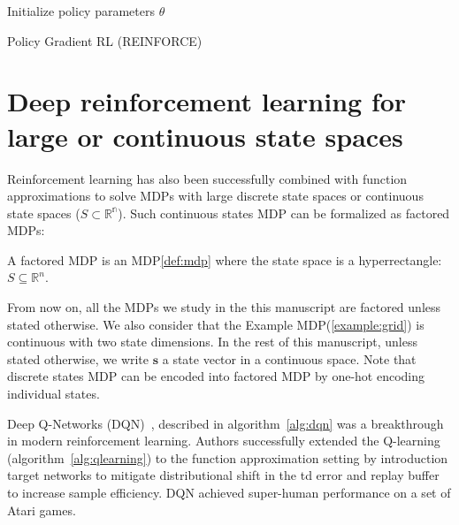 \begin{algorithm}
    Initialize policy parameters $\theta$ \\
    \caption{Policy Gradient RL (REINFORCE)}\label{alg:reinforce}
\end{algorithm}


\section{Deep reinforcement learning for large or continuous state spaces}\label{sec:drl}

Reinforcement learning has also been successfully combined with function approximations \cite{td-gammon} to solve MDPs with large discrete state spaces or continuous state spaces ($S \subset \mathbb{R^n}$).
Such continuous states MDP can be formalized as factored MDPs\cite{fmdp}:

\begin{definition}\label{def:fmdp} A factored MDP is an MDP\ref{def:mdp} where the state space is a hyperrectangle: $S\subseteq \mathbb{R}^n$.
\end{definition}

From now on, all the MDPs we study in the this manuscript are factored unless stated otherwise. 
We also consider that the Example MDP(\ref{example:grid}) is continuous with two state dimensions.
In the rest of this manuscript, unless stated otherwise, we write $\boldsymbol{s}$ a state vector in a continuous space.
Note that discrete states MDP can be encoded into factored MDP by one-hot encoding individual states.

Deep Q-Networks (DQN)~\cite{dqn}, described in algorithm~\ref{alg:dqn} was a breakthrough in modern reinforcement learning.
Authors successfully extended the Q-learning (algorithm~\ref{alg:qlearning}) to the function approximation setting by introduction target networks to mitigate distributional shift in the td error and replay buffer to increase sample efficiency.
DQN achieved super-human performance on a set of Atari games.

